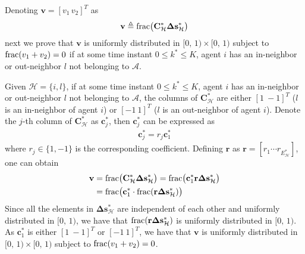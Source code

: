 \documentclass{IEEEtran}
\begin{document}
Denoting $\mathbf{v}=[v_1 \, v_2]^T$ as
\begin{equation}
	\begin{aligned}
		\mathbf{v}\triangleq{\rm frac}\big(\mathbf{C}_{\mathcal{H}}^* \boldsymbol{\Delta}\mathbf{s}_{\mathcal{H}}^*\big)
	\end{aligned} 
\end{equation}
next we prove that $\mathbf{v}$ is uniformly distributed in $[0, \, 1) \times [0, \, 1)$ subject to ${\rm frac}(v_1+v_2)=0$ if at some time instant $0\leq k^* \leq K$, agent $i$ has an in-neighbor or out-neighbor $l$ not belonging to $\mathcal{A}$.

Given $\mathcal{H}=\{i,l\}$, if at some time instant $0\leq k^* \leq K$, agent $i$ has an in-neighbor or out-neighbor $l$ not belonging to $\mathcal{A}$, the columns of $\mathbf{C}_{\mathcal{H}}^*$ are either $[1 \ -1]^T$ ($l$ is an in-neighbor of agent $i$) or $[-1 \ 1]^T$ ($l$ is an out-neighbor of agent $i$). Denote the $j$-th column of $\mathbf{C}_{\mathcal{H}}^*$ as $\mathbf{c}_j^*$, then $\mathbf{c}_j^*$ can be expressed as 
\begin{equation}
	\begin{aligned}
		\mathbf{c}_j^*= r_{j} \mathbf{c}_1^*
	\end{aligned} 
\end{equation}
where $r_{j}\in \{1, -1\}$ is the corresponding coefficient. Defining $\mathbf{r}$ as $\mathbf{r}=[r_1 \cdots r_{E_{\mathcal{H}}^*}]$, one can obtain 
\begin{equation}
	\begin{aligned}
		\mathbf{v} & ={\rm frac}\big(\mathbf{C}_{\mathcal{H}}^* \boldsymbol{\Delta}\mathbf{s}_{\mathcal{H}}^*\big) = {\rm frac}\big(\mathbf{c}_1^* \mathbf{r} \boldsymbol{\Delta}\mathbf{s}_{\mathcal{H}}^*\big) \\
		& = {\rm frac}\big(\mathbf{c}_1^* \cdot {\rm frac}(\mathbf{r} \boldsymbol{\Delta}\mathbf{s}_{\mathcal{H}}^*)\big)
	\end{aligned} 
\end{equation}
Since all the elements in $\boldsymbol{\Delta}\mathbf{s}_{\mathcal{H}}^*$ are independent of each other and uniformly distributed in $[0, \, 1)$, we have that ${\rm frac}(\mathbf{r} \boldsymbol{\Delta}\mathbf{s}_{\mathcal{H}}^*)$ is uniformly distributed in $[0, \, 1)$. As $\mathbf{c}_1^*$ is either $[1 \ -1]^T$ or $[-1 \ 1]^T$, we have that $\mathbf{v}$ is uniformly distributed in $[0, \, 1) \times [0, \, 1)$ subject to ${\rm frac}(v_1+v_2)=0$.
\end{document}
